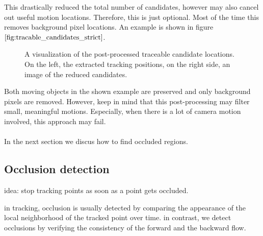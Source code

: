 This drastically reduced the total number of candidates, however may also cancel out useful motion locations. Therefore, this is just optional. Most of the time this removes background pixel locations. An example is shown in figure $\ref{fig:tracable_candidates_strict}$.
\begin{figure}[H]
\begin{center}
\end{center}
\caption[Strict Dense Candidates]{A visualization of the post-processed traceable candidate locations. On the left, the extracted tracking positions, on the right side, an image of the reduced candidates.}
\label{fig:tracable_candidates_strict}
\end{figure}
Both moving objects in the shown example are preserved and only background pixels are removed. However, keep in mind that this post-processing may filter small, meaningful motions. Especially, when there is a lot of camera motion involved, this approach may fail. \\ \\
In the next section we discus how to find occluded regions.

\subsection{Occlusion detection}
idea: stop tracking points as soon as a point gets occluded.

in tracking, occlusion is usually detected by comparing the appearance of the local neighborhood of the tracked point over time. in contrast, we detect occlusions by verifying the consistency of the forward and the backward flow.

